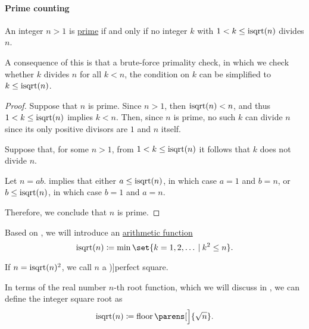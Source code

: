 \paragraph{Prime counting}

\begin{proposition}\label{thm:prime_number_sqrt}
  An integer \( n > 1 \) is \hyperref[def:prime_number]{prime} if and only if no integer \( k \) with \( 1 < k \leq \op{isqrt}(n) \) divides \( n \).
\end{proposition}
\begin{comments}
  \item A consequence of this is that a brute-force primality check, in which we check whether \( k \) divides \( n \) for all \( k < n \), the condition on \( k \) can be simplified to \( k \leq \op{isqrt}(n) \).
\end{comments}
\begin{proof}
  \SufficiencySubProof Suppose that \( n \) is prime. Since \( n > 1 \), then \( \op{isqrt}(n) < n \), and thus \( 1 < k \leq \op{isqrt}(n) \) implies \( k < n \). Then, since \( n \) is prime, no such \( k \) can divide \( n \) since its only positive divisors are \( 1 \) and \( n \) itself.

  \NecessitySubProof Suppose that, for some \( n > 1 \), from \( 1 < k \leq \op{isqrt}(n) \) it follows that \( k \) does not divide \( n \).

  Let \( n = ab \).  implies that either \( a \leq \op{isqrt}(n) \), in which case \( a = 1 \) and \( b = n \), or \( b \leq \op{isqrt}(n) \), in which case \( b = 1 \) and \( a = n \).

  Therefore, we conclude that \( n \) is prime.
\end{proof}

\begin{definition}\label{def:int_sqrt}\mimprovised
  Based on \cite{PythonDocs:3.12:math}, we will introduce an  \hyperref[def:arithmetic_function]{arithmetic function}
  \begin{equation*}
    \op{isqrt}(n) \coloneqq \min\set{ k = 1, 2, \ldots \given k^2 \leq n }.
  \end{equation*}

  If \( n = \op{isqrt}(n)^2 \), we call \( n \) a \term[en=perfect square (\cite[example 1.7.1]{Rosen2019DiscreteMathematics})]{perfect square}.
\end{definition}
\begin{comments}
  \item In terms of the real number \( n \)-th root function, which we will discuss in , we can define the integer square root as
  \begin{equation*}
    \op{isqrt}(n) \coloneqq \floor\parens[\Big]{ \sqrt{n} }.
  \end{equation*}
\end{comments}

